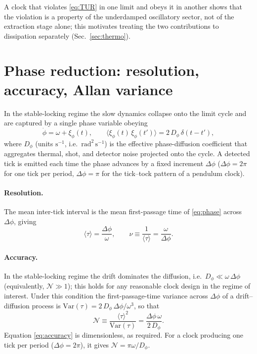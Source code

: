 \documentclass[aps,pre,reprint,amsmath,amssymb,floatfix,nofootinbib]{revtex4-2}
\newcommand{\avg}[1]{\langle #1 \rangle}
\newcommand{\Dphi}{D_{\phi}}
\begin{document}
A clock that violates \eqref{eq:TUR} in one limit and obeys it in
another shows that the violation is a property of the underdamped
oscillatory sector, not of the extraction stage alone; this motivates
treating the two contributions to dissipation separately
(Sec.~\ref{sec:thermo}).

\section{Phase reduction: resolution, accuracy, Allan variance}
\label{sec:phase}

In the stable-locking regime the slow dynamics collapse onto the limit
cycle and are captured by a single phase variable obeying
\begin{equation}
  \dot{\phi} = \omega + \xi_\phi(t),
  \qquad
  \avg{\xi_\phi(t)\,\xi_\phi(t')} = 2\,\Dphi\,\delta(t-t'),
  \label{eq:phase}
\end{equation}
where $\Dphi$ (units $\mathrm{s}^{-1}$, i.e.\ $\mathrm{rad}^2\,\mathrm{s}^{-1}$)
is the effective phase-diffusion coefficient that aggregates thermal,
shot, and detector noise projected onto the cycle. A detected tick is
emitted each time the phase advances by a fixed increment $\Delta\phi$
($\Delta\phi = 2\pi$ for one tick per period, $\Delta\phi=\pi$ for the
tick--tock pattern of a pendulum clock).

\paragraph*{Resolution.}
The mean inter-tick interval is the mean first-passage time of
\eqref{eq:phase} across $\Delta\phi$, giving
\begin{equation}
  \avg{\tau} = \frac{\Delta\phi}{\omega},
  \qquad
  \nu \equiv \frac{1}{\avg{\tau}} = \frac{\omega}{\Delta\phi}.
  \label{eq:resolution}
\end{equation}

\paragraph*{Accuracy.}
In the stable-locking regime the drift dominates the diffusion, i.e.\
$\Dphi \ll \omega\,\Delta\phi$ (equivalently, $\mathcal{N}\gg1$); this
holds for any reasonable clock design in the regime of interest.
Under this condition the first-passage-time variance across $\Delta\phi$
of a drift--diffusion process is
$\mathrm{Var}(\tau)=2\,\Dphi\,\Delta\phi/\omega^{3}$, so that
\begin{equation}
  \boxed{\;
  \mathcal{N} \equiv \frac{\avg{\tau}^2}{\mathrm{Var}(\tau)}
  = \frac{\Delta\phi\,\omega}{2\,\Dphi}.
  \;}
  \label{eq:accuracy}
\end{equation}
Equation \eqref{eq:accuracy} is dimensionless, as required. For a clock
producing one tick per period ($\Delta\phi=2\pi$), it gives
$\mathcal{N}=\pi\omega/\Dphi$.
\end{document}
